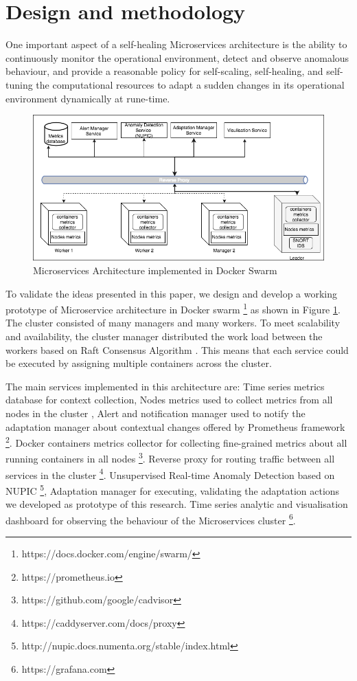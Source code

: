 \documentclass[sigconf]{acmart}
\begin{document}
\section{Design and methodology}
\label{sec:modelling}
One important aspect of a self-healing Microservices architecture is the ability to continuously monitor the operational environment, detect and observe anomalous behaviour, and provide a reasonable policy for self-scaling, self-healing, and self-tuning the computational resources to adapt a sudden changes in its operational environment dynamically at rune-time.  
\begin{figure}[ht!] 
\includegraphics[scale=0.4]{design}
\caption{Microservices Architecture implemented in Docker Swarm}
\label{fig_model}
\end{figure}

To validate the ideas presented in this paper, we design and develop a working prototype of Microservice architecture in Docker swarm \footnote{https://docs.docker.com/engine/swarm/} as shown in Figure \ref{fig_model}. The cluster consisted of many managers and many workers. To meet scalability and availability, the cluster manager distributed the work load between the workers based on Raft Consensus Algorithm \cite{ongaro2015raft}. This means that each service could be executed by assigning multiple containers across the cluster. 

The main services implemented in this architecture are: Time series metrics database for context collection, Nodes metrics used to collect metrics from all nodes in the cluster , Alert and notification manager used to notify the adaptation manager about contextual changes offered by  Prometheus framework \footnote{https://prometheus.io}. Docker containers metrics collector for collecting fine-grained metrics about all running containers in all nodes \footnote{https://github.com/google/cadvisor}. Reverse proxy for routing traffic between all services in the cluster \footnote{https://caddyserver.com/docs/proxy}. Unsupervised Real-time Anomaly Detection based on NUPIC \footnote{http://nupic.docs.numenta.org/stable/index.html}, Adaptation manager for executing, validating the adaptation actions we developed as prototype of this research. Time series analytic and visualisation dashboard for observing the behaviour of the Microservices cluster \footnote{https://grafana.com}. 
 
\end{document}
